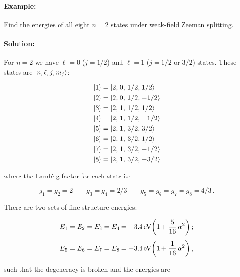 \documentclass[12pt, titlepage]{article}
\begin{document}
\begin{mdframed}[backgroundcolor=gray!20]
\paragraph*{Example:}
Find the energies of all eight $n=2$ states under weak-field Zeeman splitting.
\paragraph*{Solution:}
For $n=2$ we have $\ell = 0$ ($j=1/2$) and $\ell = 1$ ($j=1/2$ or $3/2$) states. These states are $\ket{n, \ell, j, m_j} $:

\begin{align*}
	\ket{1} &= \ket{2,\,0,\,1/2,\,1/2} \\
	\ket{2} &= \ket{2,\,0,\,1/2,\,-1/2} \\
	\ket{3} &= \ket{2,\,1,\,1/2,\,1/2} \\
	\ket{4} &= \ket{2,\,1,\,1/2,\,-1/2} \\
	\ket{5} &= \ket{2,\,1,\,3/2,\,3/2} \\
	\ket{6} &= \ket{2,\,1,\,3/2,\,1/2} \\
	\ket{7} &= \ket{2,\,1,\,3/2,\,-1/2} \\
	\ket{8} &= \ket{2,\,1,\,3/2,\,-3/2}
\end{align*}

where the Landé g-factor for each state is: 

\begin{equation*}
	g_{1} = g_{2} = 2 \qquad g_{3} = g_{4} = 2/3 \qquad g_{5} = g_{6} = g_{7} = g_{8} = 4/3 \,.
\end{equation*}

There are two sets of fine structure energies:

\begin{align*}
	E_{1} = E_{2} = E_{3} = E_{4} &= -\SI{3.4}{\eV}\qty(1+\frac{5}{16}\,\alpha^2) \,; \\[4pt]
		E_{5} = E_{6} = E_{7} = E_{8} &= -\SI{3.4}{\eV}\qty(1+\frac{1}{16}\,\alpha^2) \,,
\end{align*}

such that the degeneracy is broken and the energies are


\end{mdframed}
\end{document}
